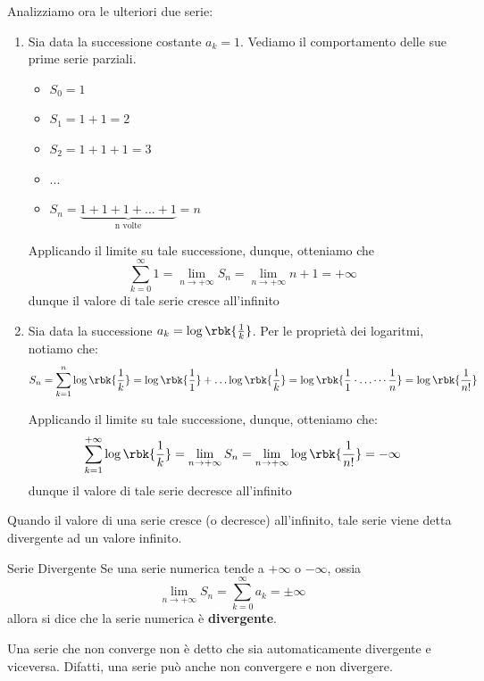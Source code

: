\documentclass[a4paper, 12pt]{report}
\begin{document}
    Analizziamo ora le ulteriori due serie:
    \begin{enumerate}
        \item Sia data la successione costante $a_k = 1$. Vediamo il comportamento delle sue prime serie parziali.
        \begin{itemize}
            \item $S_0 = 1$
            \item $S_1 = 1 + 1 = 2$
            \item $S_2 = 1 + 1 + 1 = 3$
            \item ...
            \item $S_n = \underbrace{1 + 1 + 1 + \ldots + 1}_{\text{n volte}} = n$
        \end{itemize}
                
        Applicando il limite su tale successione, dunque, otteniamo che
        \[\sum_{k = 0}^{\infty} 1 = \lim_{n \to +\infty} S_n = \lim_{n \to +\infty} n+1 = + \infty \]
        dunque il valore di tale serie cresce all'infinito
        
        \item Sia data la successione $a_k = \log \rbk{\frac{1}{k}}$. Per le proprietà dei logaritmi, notiamo che:
        \[S_n = \sum_{k = 1}^n \log \rbk{\frac{1}{k}} = \log \rbk{\frac{1}{1}} + \ldots \log \rbk{\frac{1}{k}} = \log \rbk{\frac{1}{1} \cdot \ldots \cdots \frac{1}{n}} = \log \rbk{\frac{1}{n!}}\]
        
        Applicando il limite su tale successione, dunque, otteniamo che:
        \[\sum_{k = 1}^{+\infty} \log \rbk{\frac{1}{k}} = \lim_{n \to +\infty} S_n = \lim_{n \to +\infty} \log \rbk{\frac{1}{n!}} = -\infty\]
        dunque il valore di tale serie decresce all'infinito
    \end{enumerate}

    Quando il valore di una serie cresce (o decresce) all'infinito, tale serie viene detta divergente ad un valore infinito.

    \begin{frameddefn}{Serie Divergente}
        Se una serie numerica tende a $+\infty$ o $-\infty$, ossia
        \[ \lim_{n \to +\infty} S_n = \sum_{k = 0}^{\infty} a_k = \pm \infty\]
        allora si dice che la serie numerica è \textbf{divergente}.
    \end{frameddefn}
    
    \label{no_converge}
    
    \begin{framedobs}{}
        Una serie che non converge non è detto che sia automaticamente divergente e viceversa. Difatti, una serie può anche non convergere e non divergere.
    \end{framedobs}
    
\end{document}

